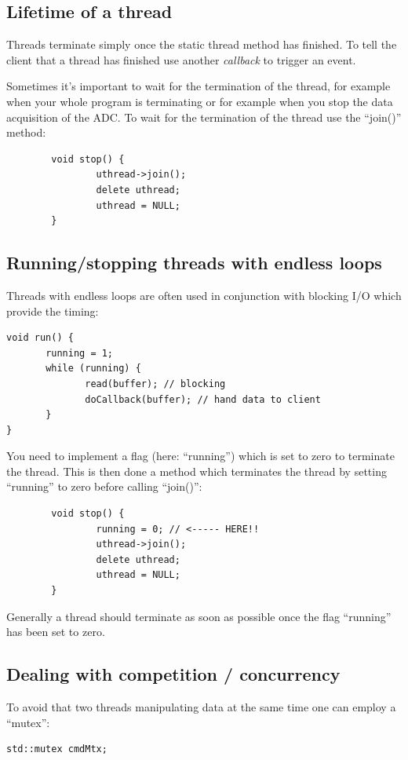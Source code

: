 \documentclass[12pt]{report}
\begin{document}
\subsection{Lifetime of a thread}
Threads terminate simply once the static thread method has finished.
To tell the client that a thread has finished use another \textsl{callback}
to trigger an event.

Sometimes it's important to wait for the termination of the thread, for example
when your whole program is terminating or for example when you stop the data acquisition of
the ADC. To wait for the
termination of the thread use the ``join()'' method:
\begin{verbatim}
        void stop() {
                uthread->join();
                delete uthread;
                uthread = NULL;
        }
\end{verbatim}



\subsection{Running/stopping threads with endless loops}
Threads with endless loops are often used in conjunction with blocking
I/O which provide the timing:
\begin{verbatim}
void run() {
       running = 1;
       while (running) {
              read(buffer); // blocking
              doCallback(buffer); // hand data to client
       }
}
\end{verbatim}
You need to implement a flag (here: ``running'') which is set to zero to terminate
the thread. This is then done a method
which terminates the thread by setting
``running'' to zero before calling ``join()'':
\begin{verbatim}
        void stop() {
                running = 0; // <----- HERE!!
                uthread->join();
                delete uthread;
                uthread = NULL;
        }
\end{verbatim}
Generally a thread should terminate as soon as possible once the flag ``running''
has been set to zero.


\subsection{Dealing with competition / concurrency}

To avoid that two threads manipulating data at the same
time one can employ a ``mutex'':

\begin{verbatim}
std::mutex cmdMtx;
\end{verbatim}
\end{document}
